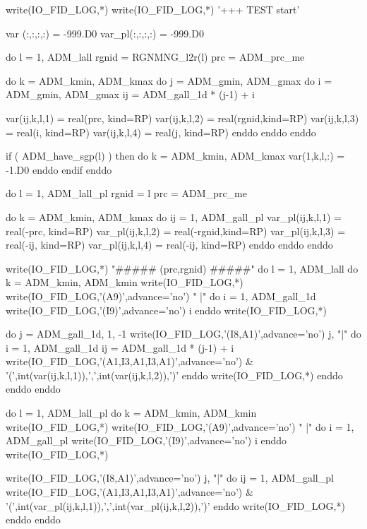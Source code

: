 \begin{LstF90}[name=COMM_debugtest,firstnumber=last]
  write(IO_FID_LOG,*)
  write(IO_FID_LOG,*) '+++ TEST start'

  var   (:,:,:,:) = -999.D0
  var_pl(:,:,:,:) = -999.D0

  do l = 1, ADM_lall
     rgnid = RGNMNG_l2r(l)
     prc   = ADM_prc_me

     do k = ADM_kmin, ADM_kmax
        do j = ADM_gmin, ADM_gmax
        do i = ADM_gmin, ADM_gmax
           ij = ADM_gall_1d * (j-1) + i

           var(ij,k,l,1) = real(prc,  kind=RP)
           var(ij,k,l,2) = real(rgnid,kind=RP)
           var(ij,k,l,3) = real(i,    kind=RP)
           var(ij,k,l,4) = real(j,    kind=RP)
        enddo
        enddo
     enddo

     if ( ADM_have_sgp(l) ) then
        do k = ADM_kmin, ADM_kmax
           var(1,k,l,:) = -1.D0
        enddo
     endif
  enddo

  do l = 1, ADM_lall_pl
     rgnid = l
     prc   = ADM_prc_me

     do k  = ADM_kmin, ADM_kmax
     do ij = 1, ADM_gall_pl
        var_pl(ij,k,l,1) = real(-prc,  kind=RP)
        var_pl(ij,k,l,2) = real(-rgnid,kind=RP)
        var_pl(ij,k,l,3) = real(-ij,   kind=RP)
        var_pl(ij,k,l,4) = real(-ij,   kind=RP)
     enddo
     enddo
  enddo

  write(IO_FID_LOG,*) "##### (prc,rgnid) #####"
  do l  = 1, ADM_lall
  do k = ADM_kmin, ADM_kmin
     write(IO_FID_LOG,*)
     write(IO_FID_LOG,'(A9)',advance='no') "        |"
     do i = 1, ADM_gall_1d
        write(IO_FID_LOG,'(I9)',advance='no') i
     enddo
     write(IO_FID_LOG,*)

     do j = ADM_gall_1d, 1, -1
        write(IO_FID_LOG,'(I8,A1)',advance='no') j, "|"
        do i = 1, ADM_gall_1d
           ij = ADM_gall_1d * (j-1) + i
           write(IO_FID_LOG,'(A1,I3,A1,I3,A1)',advance='no') &
                      '(',int(var(ij,k,l,1)),',',int(var(ij,k,l,2)),')'
        enddo
        write(IO_FID_LOG,*)
     enddo
  enddo
  enddo

  do l  = 1, ADM_lall_pl
  do k = ADM_kmin, ADM_kmin
     write(IO_FID_LOG,*)
     write(IO_FID_LOG,'(A9)',advance='no') "        |"
     do i = 1, ADM_gall_pl
        write(IO_FID_LOG,'(I9)',advance='no') i
     enddo
     write(IO_FID_LOG,*)

     write(IO_FID_LOG,'(I8,A1)',advance='no') j, "|"
     do ij = 1, ADM_gall_pl
        write(IO_FID_LOG,'(A1,I3,A1,I3,A1)',advance='no') &
                   '(',int(var_pl(ij,k,l,1)),',',int(var_pl(ij,k,l,2)),')'
     enddo
     write(IO_FID_LOG,*)
  enddo
  enddo


\end{LstF90}
